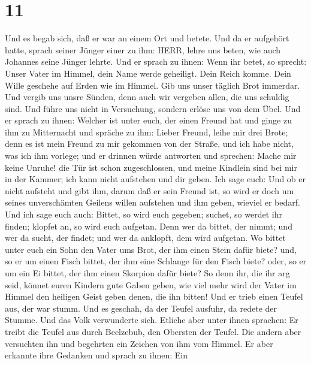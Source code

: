 \hypertarget{section-10}{%
\section{11}\label{section-10}}

 Und es begab sich, daß er war an einem Ort und betete. Und
da er aufgehört hatte, sprach seiner Jünger einer zu ihm: HERR, lehre
uns beten, wie auch Johannes seine Jünger lehrte.  Und er
sprach zu ihnen: Wenn ihr betet, so sprecht: Unser Vater im Himmel, dein
Name werde geheiligt. Dein Reich komme. Dein Wille geschehe auf Erden
wie im Himmel.  Gib uns unser täglich Brot immerdar.
 Und vergib uns unsre Sünden, denn auch wir vergeben allen,
die uns schuldig sind. Und führe uns nicht in Versuchung, sondern erlöse
uns von dem Übel.  Und er sprach zu ihnen: Welcher ist unter
euch, der einen Freund hat und ginge zu ihm zu Mitternacht und spräche
zu ihm: Lieber Freund, leihe mir drei Brote;  denn es ist
mein Freund zu mir gekommen von der Straße, und ich habe nicht, was ich
ihm vorlege;  und er drinnen würde antworten und sprechen:
Mache mir keine Unruhe! die Tür ist schon zugeschlossen, und meine
Kindlein sind bei mir in der Kammer; ich kann nicht aufstehen und dir
geben.  Ich sage euch: Und ob er nicht aufsteht und gibt
ihm, darum daß er sein Freund ist, so wird er doch um seines
unverschämten Geilens willen aufstehen und ihm geben, wieviel er bedarf.
 Und ich sage euch auch: Bittet, so wird euch gegeben;
suchet, so werdet ihr finden; klopfet an, so wird euch aufgetan.
 Denn wer da bittet, der nimmt; und wer da sucht, der
findet; und wer da anklopft, dem wird aufgetan.  Wo bittet
unter euch ein Sohn den Vater ums Brot, der ihm einen Stein dafür biete?
und, so er um einen Fisch bittet, der ihm eine Schlange für den Fisch
biete?  oder, so er um ein Ei bittet, der ihm einen
Skorpion dafür biete?  So denn ihr, die ihr arg seid,
könnet euren Kindern gute Gaben geben, wie viel mehr wird der Vater im
Himmel den heiligen Geist geben denen, die ihn bitten!  Und
er trieb einen Teufel aus, der war stumm. Und es geschah, da der Teufel
ausfuhr, da redete der Stumme. Und das Volk verwunderte sich.
 Etliche aber unter ihnen sprachen: Er treibt die Teufel
aus durch Beelzebub, den Obersten der Teufel.  Die andern
aber versuchten ihn und begehrten ein Zeichen von ihm vom Himmel.
 Er aber erkannte ihre Gedanken und sprach zu ihnen: Ein
